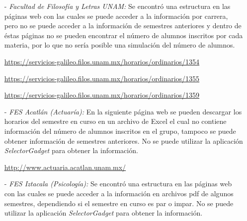 \begin{itemize}
\item[-] \textit{Facultad de Filosofía y Letras UNAM:} Se encontró una estructura en las páginas web con las cuales se puede acceder a la información por carrera, pero no se puede acceder a la información de semestres anteriores y dentro de éstas páginas no se pueden encontrar el número de alumnos inscritos por cada materia, por lo que no sería posible una simulación del número de alumnos.

\url{https://servicios-galileo.filos.unam.mx/horarios/ordinarios/1354}

\url{https://servicios-galileo.filos.unam.mx/horarios/ordinarios/1355}

\url{https://servicios-galileo.filos.unam.mx/horarios/ordinarios/1359}


%
%

\item[-] \textit{FES Acatlán (Actuaría):} En la siguiente página web se pueden descargar los horarios del semestre en curso en un archivo de Excel el cual no contiene información del número de alumnos inscritos en el grupo, tampoco se puede obtener información de semestres anteriores. No se puede utilizar la aplicación \textit{SelectorGadget} para obtener la información.

\url{http://www.actuaria.acatlan.unam.mx/}

\item[-] \textit{FES Iztacala (Psicología):} Se encontró una estructura en las páginas web con las cuales se puede acceder a la información en archivos pdf de algunos semestres, dependiendo si el semestre en curso es par o impar. No se puede utilizar la aplicación \textit{SelectorGadget} para obtener la información.



\end{itemize}
